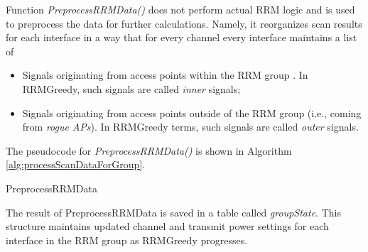 Function \textit{PreprocessRRMData()} does not perform actual RRM logic and is used to preprocess the data for further calculations. Namely, it reorganizes scan results for each interface in a way that for every channel every interface maintains a list of
\begin{itemize}
    \item Signals originating from access points within the RRM group \rrmG. In RRMGreedy, such signals are called \textit{inner} signals;
    \item Signals originating from access points outside of the RRM group (i.e., coming from \textit{rogue APs}). In RRMGreedy terms, such signals are called \textit{outer} signals.
\end{itemize}
The pseudocode for \textit{PreprocessRRMData()} is shown in Algorithm \ref{alg:processScanDataForGroup}.

\begin{algorithm}[H]
\label{alg:processScanDataForGroup}
\caption{PreprocessRRMData}
\DontPrintSemicolon

\end{algorithm}
The result of PreprocessRRMData is saved in a table called \textit{groupState}. This structure maintains updated channel and transmit power settings for each interface in the RRM group as RRMGreedy progresses.


